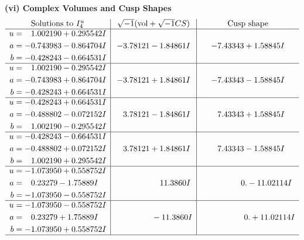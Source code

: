 \documentclass[1p]{elsarticle_modified}
\theoremstyle{definition}
\newcommand{\I}{\sqrt{-1}}
\begin{document}
\newpage\flushleft \textbf{(vi) Complex Volumes and Cusp Shapes}
$$\begin{array}{c|c|c}  
\text{Solutions to }I^u_{4}& \I (\text{vol} + \sqrt{-1}CS) & \text{Cusp shape}\\
 \hline 
\begin{aligned}
u &= \phantom{-}1.002190 + 0.295542 I \\
a &= -0.743983 - 0.864704 I \\
b &= -0.428243 - 0.664531 I\end{aligned}
 & -3.78121 - 1.84861 I & -7.43343 + 1.58845 I \\ \hline\begin{aligned}
u &= \phantom{-}1.002190 - 0.295542 I \\
a &= -0.743983 + 0.864704 I \\
b &= -0.428243 + 0.664531 I\end{aligned}
 & -3.78121 + 1.84861 I & -7.43343 - 1.58845 I \\ \hline\begin{aligned}
u &= -0.428243 + 0.664531 I \\
a &= -0.488802 - 0.072152 I \\
b &= \phantom{-}1.002190 - 0.295542 I\end{aligned}
 & \phantom{-}3.78121 - 1.84861 I & \phantom{-}7.43343 + 1.58845 I \\ \hline\begin{aligned}
u &= -0.428243 - 0.664531 I \\
a &= -0.488802 + 0.072152 I \\
b &= \phantom{-}1.002190 + 0.295542 I\end{aligned}
 & \phantom{-}3.78121 + 1.84861 I & \phantom{-}7.43343 - 1.58845 I \\ \hline\begin{aligned}
u &= -1.073950 + 0.558752 I \\
a &= \phantom{-}0.23279 - 1.75889 I \\
b &= -1.073950 - 0.558752 I\end{aligned}
 & \phantom{-0.000000 -}11.3860 I & \phantom{-0.000000 } 0. - 11.02114 I \\ \hline\begin{aligned}
u &= -1.073950 - 0.558752 I \\
a &= \phantom{-}0.23279 + 1.75889 I \\
b &= -1.073950 + 0.558752 I\end{aligned}
 & \phantom{-0.000000 } -11.3860 I & \phantom{-0.000000 -}0. + 11.02114 I\\
 \hline 
 \end{array}$$\newpage\newpage\renewcommand{\arraystretch}{1}
\end{document}
